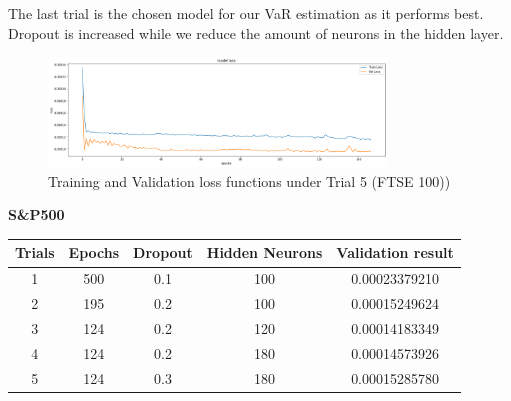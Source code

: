 \documentclass[a4paper,11pt,oneside]{book}
\begin{document}
 The last trial is the chosen model for our VaR estimation as it performs best. Dropout is increased while we reduce the amount of neurons in the hidden layer. 
\begin{figure}[!h]
	\centering
	\includegraphics[width=0.8\textwidth]{figures/FTSE5}
	\caption{Training and Validation loss functions under Trial 5 (FTSE 100))}
	\label{FTSE5}
\end{figure}
 
 
 \textbf{S\&P500}


\begin{center}
	\begin{tabular}{||c c c c c||} 
		\hline
		Trials & Epochs & Dropout & Hidden Neurons & Validation result\\ [0.5ex] 
		\hline\hline
		1 & 500 & 0.1 & 100 & 0.00023379210 \\ 
		\hline
		2 & 195 & 0.2 & 100 & 0.00015249624 \\
		\hline
		3 & 124 & 0.2 & 120 & 0.00014183349 \\
		\hline
		4 & 124 & 0.2 & 180 & 0.00014573926 \\
		\hline
		5 & 124 & 0.3 & 180 & 0.00015285780 \\ [1ex] 
		\hline
	\end{tabular}
\end{center}
\end{document}
